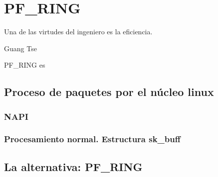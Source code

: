 \chapter{PF\_RING}
\pagestyle{esitscCD}
\epigraph{ Una de las virtudes del ingeniero es la eficiencia.  }{Guang Tse}

\lettrine[lraise=-0.1, lines=2, loversize=0.25]{P}F\_RING  es

% 

\section{Proceso de paquetes por el núcleo linux}
\subsection{NAPI}

\subsection{Procesamiento normal. Estructura sk\_buff}
\section{La alternativa: PF\_RING}

